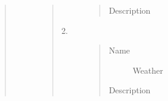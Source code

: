\documentclass[letterpaper,10pt,english]{sphinxmanual}
\begin{document}
\begin{quote}
\begin{description}
\begin{quote}
\begin{description}
\begin{quote}
\begin{description}
\item[{Description}] \leavevmode
{}

\end{description}\end{quote}

\item[{2.}] \leavevmode\begin{quote}\begin{description}
\item[{Name}] \leavevmode
Weather

\item[{Description}] \leavevmode
{}

\end{description}\end{quote}

\end{description}\end{quote}

\end{description}\end{quote}
\end{document}
